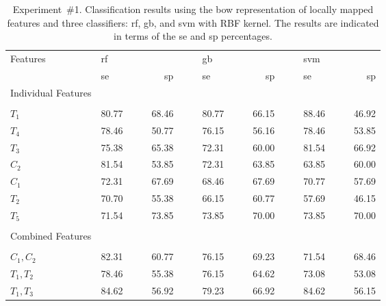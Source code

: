 \begin{table}
	\caption[Results obtained using locally mapped features, Experiment~\#1]{Experiment~\#1. Classification results using the \ac{bow} representation of locally mapped features and three classifiers: \acf{rf}, \acf{gb}, and \acf{svm} with RBF kernel.
	The results are indicated in terms of the \acf{se} and \acf{sp} percentages.}
	\label{tab:localmapExp1}
	\medskip
	\centering		
	\footnotesize{
	\begin{tabularx}{1.01\textwidth}{@{}l	lllr	 ll	lllr	 ll	lllr@{}}
	\toprule
	Features & \multicolumn{4}{l}{\ac{rf}} & & & \multicolumn{4}{l}{\ac{gb}} & & & \multicolumn{4}{l}{\ac{svm}}\\
	\cmidrule{2-5} \cmidrule{8-11} \cmidrule{14-17}
	& \ac{se} & & & \ac{sp} & & &  \ac{se} & & & \ac{sp} & & &  \ac{se} & & &  \ac{sp}\\
	\cmidrule{2-17}
	Individual Features\\
	\multicolumn{17}{l}{}\\[-1ex]
	$T_1$  & 80.77 & & &  68.46 & & &  80.77 & & &  66.15 & & &  \cellcolor[gray]{0.8}88.46 & \cellcolor[gray]{0.8}&\cellcolor[gray]{0.8} &  \cellcolor[gray]{0.8}46.92 \\
	$T_4$  & 78.46 & & &  50.77 & & &  76.15 & & &  56.16 & & &  78.46 & & &  53.85 \\
	$T_3$  & 75.38 & & &  65.38 & & &  72.31 & & &  60.00 & & &  81.54 & & &  66.92 \\
	$C_2$  & \cellcolor[gray]{0.8}81.54 &\cellcolor[gray]{0.8} & \cellcolor[gray]{0.8}&  \cellcolor[gray]{0.8}53.85 & & &  72.31 & & &  63.85 & & &  63.85 & & &  60.00 \\
	$C_1$  & 72.31 & & &  67.69 & & &  68.46 & & &  67.69 & & &  70.77 & & &  57.69 \\	
	$T_2$  & 70.70 & & &  55.38 & & &  66.15 & & &  60.77 & & &  57.69 & & &  46.15 \\	
	$T_5$ & 71.54 & & &  73.85 & & &  73.85 & & &  70.00 & & &  73.85 & & &  70.00 \\	
	\multicolumn{17}{l}{}\\
	Combined Features\\
	\multicolumn{17}{l}{}\\[-1ex]
	$C_1,C_2$ 					& 82.31 & & & 60.77 & & & 76.15 & & & 69.23 & & & 71.54 & & & 68.46\\
	$T_1,T_2$ 					& 78.46 & & & 55.38 & & & 76.15 & & & 64.62 & & & 73.08 & & & 53.08 \\	
	$T_1,T_3$ 					& \cellcolor[gray]{0.8}84.62 &\cellcolor[gray]{0.8} &\cellcolor[gray]{0.8} & \cellcolor[gray]{0.8}56.92 & & & 79.23 & & & 66.92 & & & \cellcolor[gray]{0.8}84.62 &\cellcolor[gray]{0.8} &\cellcolor[gray]{0.8} & \cellcolor[gray]{0.8}56.15\\

\end{tabularx}}
\end{table}
